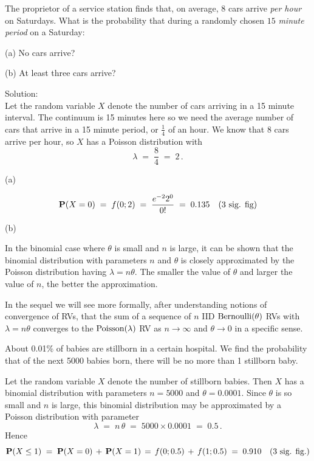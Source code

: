 \begin{example}\label{Eg:serviceStation}
The proprietor of a service station finds that, on average, $8$
  cars arrive \emph{per hour} on Saturdays. What is the probability
  that during a randomly chosen $15$ \emph{minute period} on a Saturday:
\be
\item[(a)] No cars arrive?
\item[(b)]  At least three cars arrive?
\ee

Solution:\\[4pt]
Let the random variable $X$ denote the number of cars
  arriving in a 15 minute interval. The continuum is 15 minutes here so
  we need the average number of cars that arrive in a 15 minute
  period, or $\frac{1}{4}$ of an hour.  We know that 8 cars arrive per
  hour, so  $X$ has a Poisson distribution
  with
\[\lambda \;=\; \frac{8}{4}\;=\; 2\,.\]

\be
\item[(a)]

\[\mathbf{P}(X=0)\;=\;  f(0; 2)\;=\;  \frac{ e^{-2} 2^0}{0!}\;=\; 0.135 \quad (\text{3 sig. fig})\]

\item[(b)]
\ee
\end{example}

\begin{rem}
In the binomial case where $\theta$ is small and $n$ is large, it can be shown that the
binomial distribution with parameters $n$ and $\theta$ is closely
approximated by the Poisson distribution having $\lambda = n \theta$. The
smaller the value of $\theta$ and larger the value of $n$, the better the approximation.

In the sequel we will see more formally, after understanding notions of convergence of RVs, that the sum of a sequence of $n$ IID $\mbox{{\rm Bernoulli}}(\theta)$ RVs with $\lambda = n \theta$ converges to the $\mbox{{\rm Poisson}}(\lambda)$ RV as $n \to \infty$ and $\theta \to 0$ in a specific sense.
\end{rem}

\begin{example}\label{Eg:still-born}
{ About 0.01\% of babies are stillborn in a certain hospital. We find the probability that of
  the next 5000 babies born, there will be no more than 1 stillborn baby.

  Let the random variable $X$ denote the number of
stillborn babies. Then $X$ has a binomial distribution with parameters
$n=5000$ and $\theta = 0.0001$.  Since $\theta$ is so small and $n$ is
large, this
binomial distribution may be approximated by a Poisson distribution
  with parameter
\[\lambda\;=\; n\,\theta\;=\; 5000 \times 0.0001 \;=\; 0.5\,. \]
Hence
 \[\mathbf{P}(X\leq 1)\;=\; \mathbf{P}(X=0)\,+\, \mathbf{P}(X=1)\,=\, f(0;0.5) \,+\, f(1;0.5)\;=\; 0.910 \quad (\text{3 sig. fig.})\]
}
\end{example}

